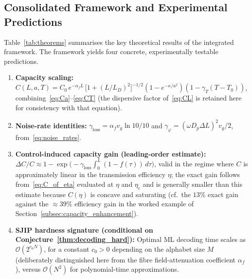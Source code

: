 \documentclass[journal,twocolumn]{IEEEtran}
\theoremstyle{definition}
\theoremstyle{plain}
\newcommand{\alphaf}{\alpha_{f}}
\begin{document}
\subsection{Consolidated Framework and Experimental Predictions}

Table~\ref{tab:theorems} summarises the key theoretical results of
the integrated framework.  The framework yields four concrete,
experimentally testable predictions.
\begin{enumerate}[leftmargin=*, label=(\arabic*), itemsep=2pt]
  \item \textbf{Capacity scaling:}
    $C(L,a,T) = C_0\,e^{-\alphaf L}\,
    \bigl[1+(L/L_D)^2\bigr]^{-1/2}(1-e^{-\kappa/a^2})
    (1-\gamma_T(T-T_0))$, combining~\eqref{eq:Ca}--\eqref{eq:CT} (the
    dispersive factor of~\eqref{eq:CL} is retained here for
    consistency with that equation).
  \item \textbf{Noise-rate identities:}
    $\gamma_{\mathrm{loss}} = \alphaf v_g \ln 10 / 10$ and
    $\gamma_\varphi = (\omega D_p \Delta L)^2 v_g / 2$,
    from~\eqref{eq:noise_rates}.
  \item \textbf{Control-induced capacity gain (leading-order
    estimate):}
    $\Delta C/C \approx 1 - \exp\!\bigl(-\gamma_{\mathrm{loss}}
    \int_0^L(1-f(\tau))\,d\tau\bigr)$, valid in the regime where $C$
    is approximately linear in the transmission efficiency $\eta$;
    the exact gain follows from~\eqref{eq:C_of_eta} evaluated at
    $\eta$ and $\eta_c$ and is generally smaller than this estimate
    because $C(\eta)$ is concave and saturating (cf.\ the $13\%$
    exact gain against the $\approx 39\%$ efficiency gain in the
    worked example of Section~\ref{subsec:capacity_enhancement}).
  \item \textbf{SJIP hardness signature (conditional on
    Conjecture~\ref{thm:decoding_hard}):} Optimal ML decoding time
    scales as $\mathcal{O}(2^{c_0 N})$, for a constant $c_0>0$
    depending on the alphabet size $M$ (deliberately distinguished
    here from the fibre field-attenuation coefficient $\alphaf$),
    versus $\mathcal{O}(N^2)$ for polynomial-time approximations.
\end{enumerate}
\end{document}
